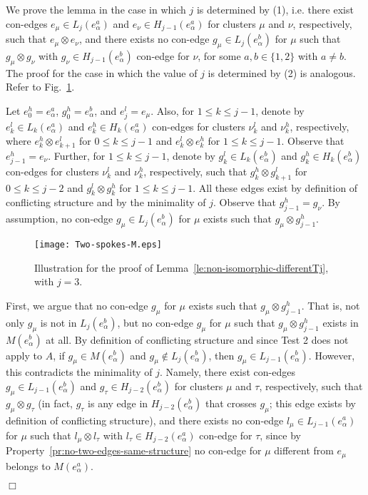 \documentclass[letter,runningheads]{llncs}
\renewenvironment{proof}
{{\em Proof.\ }}{\hspace*{\fill}$\Box$\par\vspace{2mm}}
\newcommand{\conf}{\otimes}
\begin{document}
\begin{proof}
We prove the lemma in the case in which $j$ is determined by (1), i.e. there exist con-edges $e_{\mu}\in L_j(e^a_{\alpha})$ and $e_{\nu}\in H_{j-1}(e^a_{\alpha})$ for clusters $\mu$ and $\nu$, respectively, such that $e_{\mu}\conf e_{\nu}$, and there exists no con-edge $g_{\mu}\in L_j(e^b_{\alpha})$ for $\mu$ such that $g_{\mu}\conf g_{\nu}$ with $g_{\nu}\in H_{j-1}(e^b_{\alpha})$ con-edge for $\nu$, for some $a,b\in\{1,2\}$ with $a\neq b$. The proof for the case in which the value of $j$ is determined by (2) is analogous. Refer to Fig.~\ref{fig:two-spokes}.

Let $e^h_0=e^a_{\alpha}$, $g^h_0=e^b_{\alpha}$, and $e^l_j=e_{\mu}$. Also, for $1\leq k\leq j-1$, denote by $e^l_k\in L_k(e^a_{\alpha})$ and $e^h_k \in H_k(e^a_{\alpha})$ con-edges for clusters $\nu^l_k$ and $\nu^h_k$, respectively, where $e^h_k\conf e^l_{k+1}$ for $0\leq k\leq j-1$ and $e^l_k\conf e^h_k$ for $1\leq k\leq j-1$. Observe that $e^h_{j-1}=e_{\nu}$. Further, for $1\leq k\leq j-1$, denote by $g^l_k\in L_k(e^b_{\alpha})$ and $g^h_k \in H_k(e^b_{\alpha})$ con-edges for clusters $\nu^l_k$ and $\nu^h_k$, respectively, such that $g^h_k\conf g^l_{k+1}$ for $0\leq k\leq j-2$ and $g^l_k\conf g^h_k$ for $1\leq k\leq j-1$. All these edges exist by definition of conflicting structure and by the minimality of $j$. Observe that $g^h_{j-1}=g_{\nu}$.  By assumption, no con-edge $g_{\mu}\in L_j(e^b_{\alpha})$ for $\mu$ exists such that $g_{\mu}\conf g^h_{j-1}$.

\begin{figure}[tb]
\begin{center}
\mbox{\texttt{[image: Two-spokes-M.eps]}}
\caption{Illustration for the proof of Lemma~\ref{le:non-isomorphic-differentTj}, with $j=3$.}
\label{fig:two-spokes}
\end{center}
\end{figure}

First, we argue that no con-edge $g_{\mu}$ for $\mu$ exists such that $g_{\mu}\conf g^h_{j-1}$. That is, not only $g_{\mu}$ is not in $L_j(e^b_{\alpha})$, but no con-edge $g_{\mu}$ for $\mu$ such that $g_{\mu}\conf g^h_{j-1}$ exists in $M(e^b_{\alpha})$ at all. By definition of conflicting structure and since {\sc Test 2} does not apply to $A$, if $g_{\mu}\in M(e^b_{\alpha})$ and $g_{\mu}\notin L_j(e^b_{\alpha})$, then $g_{\mu}\in L_{j-1}(e^b_{\alpha})$. However, this contradicts the minimality of $j$. Namely,  there exist con-edges $g_{\mu}\in L_{j-1}(e^b_{\alpha})$ and $g_{\tau}\in H_{j-2}(e^b_{\alpha})$ for clusters $\mu$ and $\tau$, respectively, such that $g_{\mu}\conf g_{\tau}$ (in fact, $g_{\tau}$ is any edge in $H_{j-2}(e^b_{\alpha})$ that crosses $g_{\mu}$; this edge exists by definition of conflicting structure), and there exists no con-edge $l_{\mu}\in L_{j-1}(e^a_{\alpha})$ for $\mu$ such that $l_{\mu}\conf l_{\tau}$ with $l_{\tau}\in H_{j-2}(e^a_{\alpha})$ con-edge for $\tau$, since by Property~\ref{pr:no-two-edges-same-structure} no con-edge for $\mu$ different from $e_{\mu}$ belongs to $M(e^a_{\alpha})$.


\end{proof}
\end{document}
